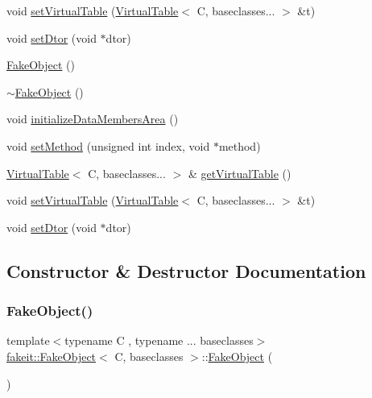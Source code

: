 \begin{DoxyCompactItemize}
\item 
void \mbox{\hyperlink{classfakeit_1_1FakeObject_a541dcdf0dd88facbf2025790c41c1964}{set\+Virtual\+Table}} (\mbox{\hyperlink{structfakeit_1_1VirtualTable}{Virtual\+Table}}$<$ C, baseclasses... $>$ \&t)
\item 
void \mbox{\hyperlink{classfakeit_1_1FakeObject_a8045605042e0351da1e5d81288ae46ec}{set\+Dtor}} (void $\ast$dtor)
\item 
\mbox{\hyperlink{classfakeit_1_1FakeObject_ad705c5388b4354d1fdeef0bdd0151167}{Fake\+Object}} ()
\item 
\mbox{\hyperlink{classfakeit_1_1FakeObject_abfc9604c62598655fdefcc98a329dbbf}{$\sim$\+Fake\+Object}} ()
\item 
void \mbox{\hyperlink{classfakeit_1_1FakeObject_a894a7e1ef1e41cec0eb91cbb3d5c73cd}{initialize\+Data\+Members\+Area}} ()
\item 
void \mbox{\hyperlink{classfakeit_1_1FakeObject_ad05ea03dec6dc302d6d7b62e47bd1219}{set\+Method}} (unsigned int index, void $\ast$method)
\item 
\mbox{\hyperlink{structfakeit_1_1VirtualTable}{Virtual\+Table}}$<$ C, baseclasses... $>$ \& \mbox{\hyperlink{classfakeit_1_1FakeObject_a28a2c51a5eebcb098d63cc0e4afd2a35}{get\+Virtual\+Table}} ()
\item 
void \mbox{\hyperlink{classfakeit_1_1FakeObject_a541dcdf0dd88facbf2025790c41c1964}{set\+Virtual\+Table}} (\mbox{\hyperlink{structfakeit_1_1VirtualTable}{Virtual\+Table}}$<$ C, baseclasses... $>$ \&t)
\item 
void \mbox{\hyperlink{classfakeit_1_1FakeObject_a8045605042e0351da1e5d81288ae46ec}{set\+Dtor}} (void $\ast$dtor)
\end{DoxyCompactItemize}


\subsection{Constructor \& Destructor Documentation}
\mbox{\label{classfakeit_1_1FakeObject_ad705c5388b4354d1fdeef0bdd0151167}} 
\subsubsection{\texorpdfstring{FakeObject()}{FakeObject()}\hspace{0.1cm}{\footnotesize\ttfamily [1/9]}}
{\footnotesize\ttfamily template$<$typename C , typename ... baseclasses$>$ \\
\mbox{\hyperlink{classfakeit_1_1FakeObject}{fakeit\+::\+Fake\+Object}}$<$ C, baseclasses $>$\+::\mbox{\hyperlink{classfakeit_1_1FakeObject}{Fake\+Object}} (\begin{DoxyParamCaption}{ }\end{DoxyParamCaption})\hspace{0.3cm}{\ttfamily [inline]}}

